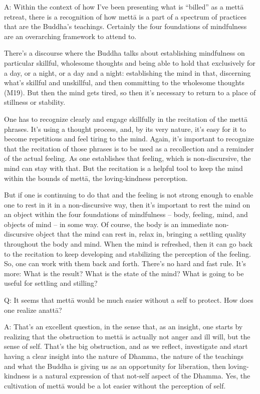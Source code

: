 \qaspace
A: Within the context of how I’ve been presenting what is “billed” as a
mettā retreat, there is a recognition of how mettā is a part of a
spectrum of practices that are the Buddha’s teachings. Certainly the
four foundations of mindfulness are an overarching framework to attend
to.

There’s a discourse where the Buddha talks about establishing
mindfulness on particular skillful, wholesome thoughts and being able to
hold that exclusively for a day, or a night, or a day and a night:
establishing the mind in that, discerning what’s skillful and
unskillful, and then committing to the wholesome thoughts (M19). But
then the mind gets tired, so then it’s necessary to return to a place of
stillness or stability.

One has to recognize clearly and engage skillfully in the recitation of
the mettā phrases. It’s using a thought process, and, by its very
nature, it’s easy for it to become repetitious and feel tiring to the
mind. Again, it’s important to recognize that the recitation of those
phrases is to be used as a recollection and a reminder of the actual
feeling. As one establishes that feeling, which is non-discursive, the
mind can stay with that. But the recitation is a helpful tool to keep
the mind within the bounds of mettā, the loving-kindness perception.

But if one is continuing to do that and the feeling is not strong enough
to enable one to rest in it in a non-discursive way, then it’s important
to rest the mind on an object within the four foundations of mindfulness
– body, feeling, mind, and objects of mind – in some way. Of course, the
body is an immediate non-discursive object that the mind can rest in,
relax in, bringing a settling quality throughout the body and mind. When
the mind is refreshed, then it can go back to the recitation to keep
developing and stabilizing the perception of the feeling. So, one can
work with them back and forth. There’s no hard and fast rule. It’s more:
What is the result? What is the state of the mind? What is going to be
useful for settling and stilling?

\qaspace
Q: It seems that mettā would be much easier without a self to protect.
How does one realize anattā?

\qaspace
A: That’s an excellent question, in the sense that, as an insight, one
starts by realizing that the obstruction to mettā is actually not anger
and ill will, but the sense of self. That’s the big obstruction, and as
we reflect, investigate and start having a clear insight into the nature
of Dhamma, the nature of the teachings and what the Buddha is giving us
as an opportunity for liberation, then loving-kindness is a natural
expression of that not-self aspect of the Dhamma. Yes, the cultivation
of mettā would be a lot easier without the perception of self.

